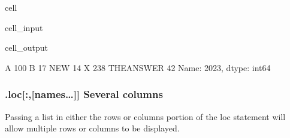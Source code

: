 \documentclass[letterpaper,10pt,english]{jupyterBook}
\begin{document}
\begin{sphinxuseclass}{cell}\begin{sphinxVerbatimInput}

\begin{sphinxuseclass}{cell_input}
\begin{sphinxVerbatim}[commandchars=\\\{\}]
\PYG{p}{[}\PYG{p}{]}
\end{sphinxVerbatim}

\end{sphinxuseclass}\end{sphinxVerbatimInput}
\begin{sphinxVerbatimOutput}

\begin{sphinxuseclass}{cell_output}
\begin{sphinxVerbatim}[commandchars=\\\{\}]
A             100
B              17
NEW            14
X             238
THE\PYGZus{}ANSWER     42
Name: 2023, dtype: int64
\end{sphinxVerbatim}

\end{sphinxuseclass}\end{sphinxVerbatimOutput}

\end{sphinxuseclass}

\subsubsection{.loc{[}:,{[}names…{]}{]} Several columns}
\label{\detokenize{content/04_PythonEssentials/PythonPandasDataframes:loc-names-several-columns}}
\sphinxAtStartPar
Passing a list in either the rows or columns portion of the loc statement will allow multiple rows or columns to be displayed.
\end{document}
